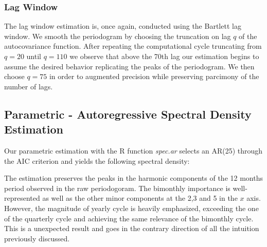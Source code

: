 \documentclass[12pt]{article} %
\begin{document}


\subsubsection{Lag Window}

The lag window estimation is, once again, conducted using the Bartlett lag window. We smooth the periodogram by choosing the truncation on lag $q$ of the autocovariance function. After repeating the computational cycle truncating from $q=20$ until $q=110$ we observe that above the 70th lag our estimation begins to assume the desired behavior replicating the peaks of the periodogram. We then choose $q=75$ in order to augmented precision while preserving parcimony of the number of lags.




\subsection{Parametric - Autoregressive Spectral Density Estimation}

Our parametric estimation with the R function \emph{spec.ar} selects an AR(25) through the AIC criterion and yields the following spectral density:



The estimation preserves the peaks in the harmonic components of the 12 months period observed in the raw periodogoram. The bimonthly importance is well-represented as well as the other minor components at the 2,3 and 5 in the $x$ axis.  However, the magnitude of yearly cycle is heavily emphasized, exceeding the one of the quarterly cycle and achieving the same relevance of the bimonthly cycle. This is a unexpected result and goes in the contrary direction of all the intuition previously discussed.


\label{Bibliography}

 


\end{document}
